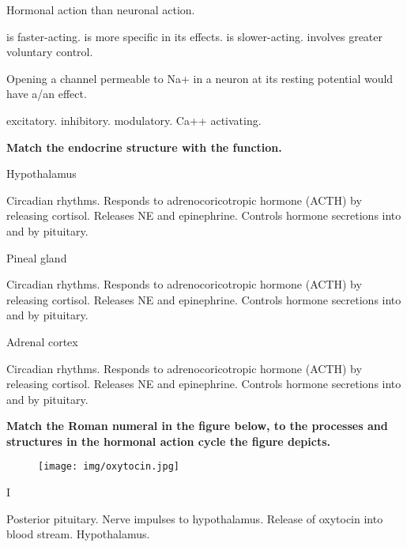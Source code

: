 \documentclass[answers]{exam}
\begin{document}
\begin{questions}
\question Hormonal action \fillin than neuronal action.
\begin{choices}
\choice is faster-acting.
\choice is more specific in its effects.
\correctchoice is slower-acting.
\choice involves greater voluntary control.
\end{choices}

\question Opening a channel permeable to Na+ in a neuron at its resting potential would have a/an \fillin effect.
\begin{choices}
\correctchoice excitatory.
\choice inhibitory.
\choice modulatory.
\choice Ca++ activating.
\end{choices}

\newpage

\textbf{Match the endocrine structure with the function.}

\question Hypothalamus
\begin{choices}
\choice Circadian rhythms.
\choice Responds to adrenocoricotropic hormone (ACTH) by releasing cortisol.
\choice Releases NE and epinephrine.
\correctchoice Controls hormone secretions into and by pituitary.
\end{choices}

\question Pineal gland
\begin{choices}
\correctchoice Circadian rhythms.
\choice Responds to adrenocoricotropic hormone (ACTH) by releasing cortisol.
\choice Releases NE and epinephrine.
\choice Controls hormone secretions into and by pituitary.
\end{choices}

\question Adrenal cortex
\begin{choices}
\choice Circadian rhythms.
\correctchoice Responds to adrenocoricotropic hormone (ACTH) by releasing cortisol.
\choice Releases NE and epinephrine.
\choice Controls hormone secretions into and by pituitary.
\end{choices}

\newpage

\textbf{Match the Roman numeral in the figure below, to the processes and structures in the hormonal action cycle the figure depicts.}

\begin{figure}[h]
\texttt{[image: img/oxytocin.jpg]}
\centering
\end{figure}

\question I
\begin{choices}
\choice Posterior pituitary.
\correctchoice Nerve impulses to hypothalamus.
\choice Release of oxytocin into blood stream.
\choice Hypothalamus.
\end{choices}


\end{questions}
\end{document}
